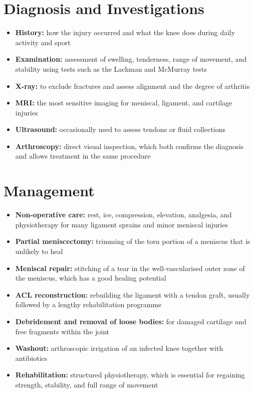 \section*{Diagnosis and Investigations}
\begin{itemize}
    \item \textbf{History:} how the injury occurred and what the knee does during daily activity and sport
    \item \textbf{Examination:} assessment of swelling, tenderness, range of movement, and stability using tests such as the Lachman and McMurray tests
    \item \textbf{X-ray:} to exclude fractures and assess alignment and the degree of arthritis
    \item \textbf{MRI:} the most sensitive imaging for meniscal, ligament, and cartilage injuries
    \item \textbf{Ultrasound:} occasionally used to assess tendons or fluid collections
    \item \textbf{Arthroscopy:} direct visual inspection, which both confirms the diagnosis and allows treatment in the same procedure
\end{itemize}

\section*{Management}
\begin{itemize}
    \item \textbf{Non-operative care:} rest, ice, compression, elevation, analgesia, and physiotherapy for many ligament sprains and minor meniscal injuries
    \item \textbf{Partial meniscectomy:} trimming of the torn portion of a meniscus that is unlikely to heal
    \item \textbf{Meniscal repair:} stitching of a tear in the well-vascularised outer zone of the meniscus, which has a good healing potential
    \item \textbf{ACL reconstruction:} rebuilding the ligament with a tendon graft, usually followed by a lengthy rehabilitation programme
    \item \textbf{Debridement and removal of loose bodies:} for damaged cartilage and free fragments within the joint
    \item \textbf{Washout:} arthroscopic irrigation of an infected knee together with antibiotics
    \item \textbf{Rehabilitation:} structured physiotherapy, which is essential for regaining strength, stability, and full range of movement
\end{itemize}


